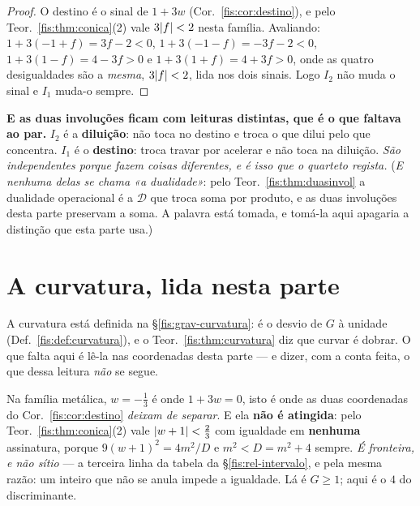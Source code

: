 \documentclass[livro.tex]{subfiles}
\begin{document}
\begin{proof}
O destino é o sinal de $1+3w$ (Cor.~\ref{fis:cor:destino}), e pelo
Teor.~\ref{fis:thm:conica}(2) vale $3\lvert f\rvert<2$ nesta família. Avaliando:
$1+3(-1+f)=3f-2<0$, $1+3(-1-f)=-3f-2<0$, $1+3(1-f)=4-3f>0$ e $1+3(1+f)=4+3f>0$,
onde as quatro desigualdades são a \emph{mesma}, $3\lvert f\rvert<2$, lida nos dois
sinais. Logo $I_2$ não muda o sinal e $I_1$ muda-o sempre.
\end{proof}

\medskip\noindent\textbf{E as duas involuções ficam com leituras distintas, que é
o que faltava ao par.} $I_2$ é a \textbf{diluição}: não toca no destino e troca
o que dilui pelo que concentra. $I_1$ é o \textbf{destino}: troca travar por
acelerar e não toca na diluição. \emph{São independentes porque fazem coisas
diferentes, e é isso que o quarteto regista.} (\emph{E nenhuma delas se chama «a
dualidade»}: pelo Teor.~\ref{fis:thm:duasinvol} a dualidade operacional é a
$\mathcal{D}$ que troca soma por produto, e as duas involuções desta parte
preservam a soma. A palavra está tomada, e tomá-la aqui apagaria a distinção que
esta parte usa.)

\section{A curvatura, lida nesta parte}\label{fis:curvatura}

\noindent A curvatura está definida na §\ref{fis:grav-curvatura}: é o desvio de
$G$ à unidade (Def.~\ref{fis:def:curvatura}), e o Teor.~\ref{fis:thm:curvatura}
diz que curvar é dobrar. O que falta aqui é lê-la nas coordenadas desta parte ---
e dizer, com a conta feita, o que dessa leitura \emph{não} se segue.


\begin{corolario}[a fronteira $w=-\tfrac13$ é borda, e não estado]\label{fis:cor:fronteira-curv}
Na família metálica, $w=-\tfrac13$ é onde $1+3w=0$, isto é onde as duas
coordenadas do Cor.~\ref{fis:cor:destino} \emph{deixam de separar}. E ela
\textbf{não é atingida}: pelo Teor.~\ref{fis:thm:conica}(2) vale
$\lvert w+1\rvert<\tfrac23$ com igualdade em \textbf{nenhuma} assinatura, porque
$9(w+1)^{2}=4m^{2}/D$ e $m^{2}<D=m^{2}+4$ sempre. \emph{É fronteira, e não
sítio} --- a terceira linha da tabela da §\ref{fis:rel-intervalo}, e pela mesma
razão: um inteiro que não se anula impede a igualdade. Lá é $G\ge1$; aqui é o
$4$ do discriminante.
\end{corolario}
\end{document}
